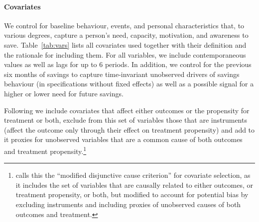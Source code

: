 

\paragraph{Covariates}%
\label{par:covariates}

We control for baseline behaviour, events, and personal characteristics that,
to various degrees, capture a person's need, capacity, motivation, and
awareness to save. Table~\ref{tab:vars} lists all covariates used
together with their definition and the rationale for including them. For all
variables, we include contemporaneous values as well as lags for up to 6
periods. In addition, we control for the previous six months of savings to
capture time-invariant unobserved drivers of savings behaviour (in
specifications without fixed effects) as well as a possible signal for a higher
or lower need for future savings.

Following \citet{vanderweele2019principles} we include covariates that affect
either outcomes or the propensity for treatment or both, exclude from this
set of variables those that are instruments (affect the outcome only through their effect on
treatment propensity) and add to it proxies for unobserved variables that are a
common cause of both outcomes and treatment propensity.\footnote{
\citet{vanderweele2019principles} calls this the ``modified disjunctive cause
criterion'' for covariate selection, as it includes the set of variables that are causally
related to either outcomes, or treatment propensity, or both, but modified to
account for potential bias by excluding instruments and including proxies of
unobserved causes of both outcomes and treatment.}

